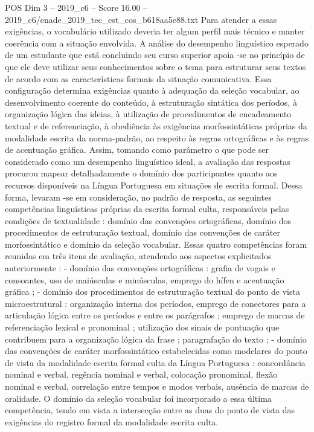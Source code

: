 \begin{textsample}{POS Dim 3 – 2019\_c6 – Score 16.00 – 2019\_c6/enade\_2019\_tec\_est\_cos\_b618aa5e88.txt}
Para atender a essas exigências, o vocabulário utilizado deveria ter algum perfil mais técnico e manter coerência com a situação envolvida.
A análise do desempenho linguístico esperado de um estudante que está concluindo seu curso superior apoia -se no princípio de que ele deve utilizar seus conhecimentos sobre o tema para estruturar seus textos de acordo com as características formais da situação comunicativa.
Essa configuração determina exigências quanto à adequação da seleção vocabular, ao desenvolvimento coerente do conteúdo, à estruturação sintática dos períodos, à organização lógica das ideias, à utilização de procedimentos de encadeamento textual e de referenciação, à obediência às exigências morfossintáticas próprias da modalidade escrita da norma-padrão, ao respeito às regras ortográficas e às regras de acentuação gráfica.
Assim, tomando como parâmetro o que pode ser considerado como um desempenho linguístico ideal, a avaliação das respostas procurou mapear detalhadamente o domínio dos participantes quanto aos recursos disponíveis na Língua Portuguesa em situações de escrita formal.
Dessa forma, levaram -se em consideração, no padrão de resposta, as seguintes competências linguísticas próprias da escrita formal culta, responsáveis pelas condições de textualidade : domínio das convenções ortográficas, domínio dos procedimentos de estruturação textual, domínio das convenções de caráter morfossintático e domínio da seleção vocabular.
Essas quatro competências foram reunidas em três itens de avaliação, atendendo aos aspectos explicitados anteriormente : - domínio das convenções ortográficas : grafia de vogais e consoantes, uso de maiúsculas e minúsculas, emprego do hífen e acentuação gráfica ; - domínio dos procedimentos de estruturação textual do ponto de vista microestrutural : organização interna dos períodos, emprego de conectores para a articulação lógica entre os períodos e entre os parágrafos ; emprego de marcas de referenciação lexical e pronominal ; utilização dos sinais de pontuação que contribuem para a organização lógica da frase ; paragrafação do texto ; - domínio das convenções de caráter morfossintático estabelecidas como modelares do ponto de vista da modalidade escrita formal culta da Língua Portuguesa : concordância nominal e verbal, regência nominal e verbal, colocação pronominal, flexão nominal e verbal, correlação entre tempos e modos verbais, ausência de marcas de oralidade.
O domínio da seleção vocabular foi incorporado a essa última competência, tendo em vista a intersecção entre as duas do ponto de vista das exigências do registro formal da modalidade escrita culta.

\end{textsample}
